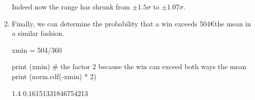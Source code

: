 \begin{solution}
\begin{enumerate}[label={\emph{\alph*})}]
Indeed now the range has shrunk from $\pm1.5\sigma$ to $\pm1.07\sigma$. 

\item Finally, we can determine the probability that a win exceeds 504\euro the mean in a similar fashion.

\begin{ipython}
xmin = 504/360

print (xmin)
# the factor 2 because the win can exceed both ways the mean
print (norm.cdf(-xmin) * 2)
\end{ipython}
\begin{ioutput}
1.4
0.16151331846754213
\end{ioutput}
\end{enumerate}
\end{solution}





